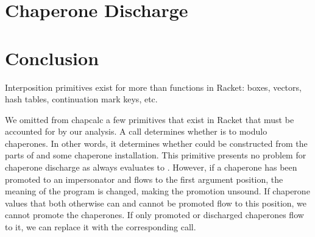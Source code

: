 \documentclass{sigplanconf}
\begin{document}

\section{Chaperone Discharge}




\section{Conclusion}

Interposition primitives exist for more than functions in Racket: boxes, vectors, hash tables, continuation mark keys, etc.

We omitted from chapcalc a few primitives that exist in Racket that must be accounted for by our analysis.
A call  determines whether  is  to  modulo chaperones.
In other words, it determines whether  could be constructed from the parts of  and some chaperone installation.
This primitive presents no problem for chaperone discharge as  always evaluates to .
However, if a chaperone has been promoted to an impersonator and flows to the first argument position, the meaning of the program is changed, making the promotion unsound.
If chaperone values that both otherwise can and cannot be promoted flow to this position, we cannot promote the chaperones.
If only promoted or discharged chaperones flow to it, we can replace it with the corresponding  call.
\end{document}
